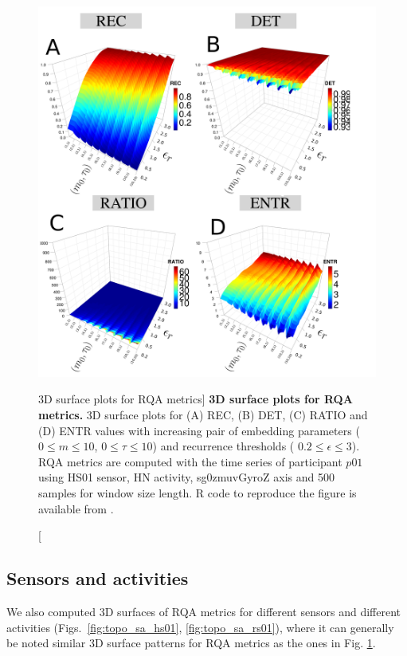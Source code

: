 \begin{figure}
\centering
\includegraphics[width=1.0\textwidth]{fig_6_09}
    \caption
	[3D surface plots for RQA metrics]{
	{\bf 3D surface plots for RQA metrics.}
	3D surface plots for (A) REC, (B) DET, (C) RATIO and (D) ENTR values 
	with increasing pair of embedding parameters 
	($0 \le m \le 10$, $0 \le \tau \le 10$) 
	and recurrence thresholds (  $ 0.2 \le \epsilon \le 3 $).
	RQA metrics are computed with the time series of participant $p01$ using 
	HS01 sensor, HN activity, sg0zmuvGyroZ axis and 500 samples 
	for window size length.
        R code to reproduce the figure is available from \cite{hwum2018}.
	}
\label{fig:topo_rqas}
\end{figure}

\newpage
\subsection{Sensors and activities}
We also computed 3D surfaces of RQA metrics for different sensors 
and different activities 
(Figs.~\ref{fig:topo_sa_hs01}, \ref{fig:topo_sa_rs01}), where it can 
generally be noted similar 3D surface patterns for RQA metrics as the ones
in Fig. \ref{fig:topo_rqas}. 

